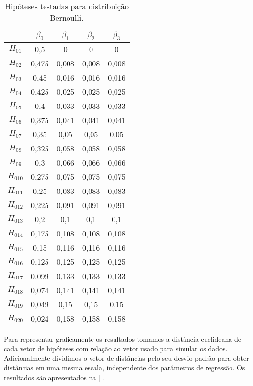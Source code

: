 \begin{table}[H]
\centering
\begin{tabular}{ccccc}
\hline
          & $\beta_0$ & $\beta_1$ & $\beta_2$ & $\beta_3$ \\ \hline
$H_{01}$  & 0,5       & 0         & 0         & 0         \\
$H_{02}$  & 0,475     & 0,008     & 0,008     & 0,008     \\
$H_{03}$  & 0,45      & 0,016     & 0,016     & 0,016     \\
$H_{04}$  & 0,425     & 0,025     & 0,025     & 0,025     \\
$H_{05}$  & 0,4       & 0,033     & 0,033     & 0,033     \\
$H_{06}$  & 0,375     & 0,041     & 0,041     & 0,041     \\
$H_{07}$  & 0,35      & 0,05      & 0,05      & 0,05      \\
$H_{08}$  & 0,325     & 0,058     & 0,058     & 0,058     \\
$H_{09}$  & 0,3       & 0,066     & 0,066     & 0,066     \\
$H_{010}$ & 0,275     & 0,075     & 0,075     & 0,075     \\
$H_{011}$ & 0,25      & 0,083     & 0,083     & 0,083     \\
$H_{012}$ & 0,225     & 0,091     & 0,091     & 0,091     \\
$H_{013}$ & 0,2       & 0,1       & 0,1       & 0,1       \\
$H_{014}$ & 0,175     & 0,108     & 0,108     & 0,108     \\
$H_{015}$ & 0,15      & 0,116     & 0,116     & 0,116     \\
$H_{016}$ & 0,125     & 0,125     & 0,125     & 0,125     \\
$H_{017}$ & 0,099     & 0,133     & 0,133     & 0,133     \\
$H_{018}$ & 0,074     & 0,141     & 0,141     & 0,141     \\
$H_{019}$ & 0,049     & 0,15      & 0,15      & 0,15      \\
$H_{020}$ & 0,024     & 0,158     & 0,158     & 0,158     \\ \hline
\end{tabular}
\caption{Hipóteses testadas para distribuição Bernoulli.}
\label{tab:th_bernoulli}
\end{table}

Para representar graficamente os resultados tomamos a distância euclideana de cada vetor de hipóteses com relação ao vetor usado para simular os dados. Adicionalmente dividimos o vetor de distâncias pelo seu desvio padrão para obter distâncias em uma mesma escala, independente dos parâmetros de regressão. Os resultados são apresentados na \autoref{}.


